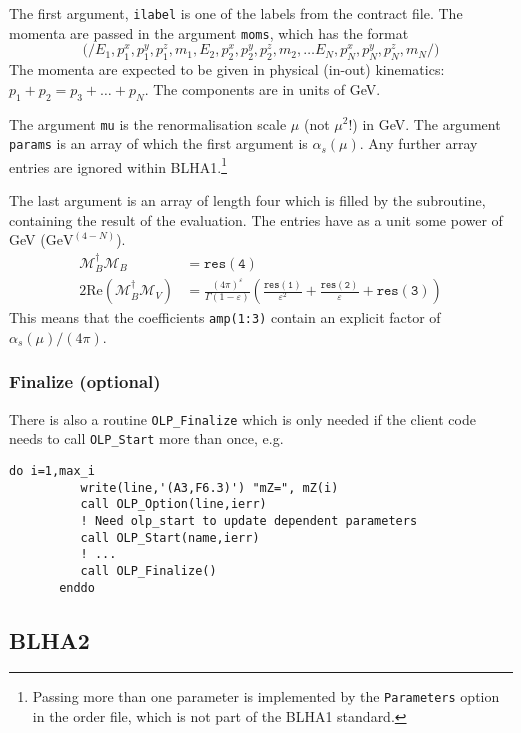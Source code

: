 The first argument, \texttt{ilabel} is one of the labels from the
contract file. The momenta are passed in the argument \texttt{moms},
which has the format
\begin{displaymath}
\mathtt{(/}
E_1, p^x_1, p^y_1, p^z_1, m_1,
E_2, p^x_2, p^y_2, p^z_2, m_2, \ldots
E_N, p^x_N, p^y_N, p^z_N, m_N
\mathtt{/)}
\end{displaymath}
The momenta are expected to be given in physical (in-out) 
kinematics: $p_1+p_2=p_3+\ldots+p_N$.
The components are in units of GeV.

The argument \texttt{mu} is the renormalisation scale $\mu$ (not $\mu^2$!)
in GeV. The argument {\tt params} is an array of which the first argument is
$\alpha_s(\mu)$. Any further array entries are ignored within BLHA1.\footnote{
Passing more than one parameter is implemented by the \texttt{Parameters}
option in the order file, which is  not part of the BLHA1 standard.}

The last argument is an array of length four which is filled by the subroutine, 
containing the result of the evaluation. The entries have as a unit some
power of GeV ($\mathrm{GeV}^{(4-N)}$).
\begin{align}
\label{eq:res}
\mathcal{M}_B^\dagger\mathcal{M}_B&=\mathtt{res(4)}\nonumber\\
2\mathrm{Re}\left(\mathcal{M}_B^\dagger\mathcal{M}_V\right)&=
\frac{(4\pi)^\varepsilon}{\Gamma(1-\varepsilon)}\left(
\frac{\mathtt{res(1)}}{\varepsilon^2}
+\frac{\mathtt{res(2)}}{\varepsilon}
+\mathtt{res(3)}
\right)
\end{align}
This means that the coefficients \texttt{amp(1:3)} contain
an explicit factor of $\alpha_s(\mu)/(4\pi)$.

\subsubsection{Finalize (optional)}
There is also a routine \texttt{OLP\_Finalize} which is only needed
if the client code needs to call \texttt{OLP\_Start} more than once, e.g.
\begin{lstlisting}[style=fortran]
       do i=1,max_i
          write(line,'(A3,F6.3)') "mZ=", mZ(i)
          call OLP_Option(line,ierr)
          ! Need olp_start to update dependent parameters
          call OLP_Start(name,ierr)
          ! ...
          call OLP_Finalize()
       enddo
\end{lstlisting}

\subsection{BLHA2}

